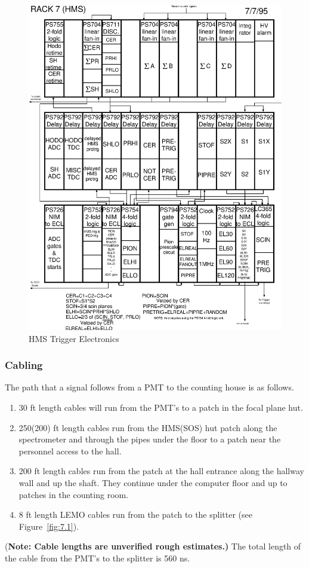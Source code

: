 \begin{figure}
\includegraphics[width=5.8in]{hms_crates.eps}
\caption{HMS Trigger Electronics\label{fig:hms_trig_logic}}
\end{figure}
\clearpage

\subsubsection{Cabling}

The path that a signal follows from a PMT to the counting house is as
follows.
\begin{enumerate}
\item 30 ft length cables will run from the PMT's to a patch in the focal
plane hut.
\item 250(200) ft length cables run from the HMS(SOS) hut patch along the
spectrometer and through the pipes
under the floor to a patch near the personnel access to the hall.
\item 200 ft length cables run from the patch at the hall entrance
along the hallway wall and up the shaft.  They continue under the
computer floor and up to patches in the counting room.
\item 8 ft length LEMO cables run from the patch to the splitter (see
Figure~\ref{fig:7.1}).
\end{enumerate}
{(\bf Note: Cable lengths are unverified rough estimates.)}
The total length of the cable from the PMT's to the splitter is 560 ns.

